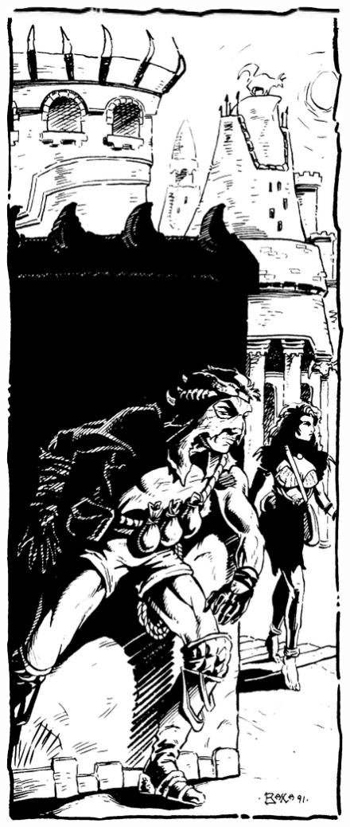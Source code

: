 \begin{figure}[t!]
\centering
\includegraphics[width=\columnwidth]{images/rogue-1.png}
\WOTC
\end{figure}

